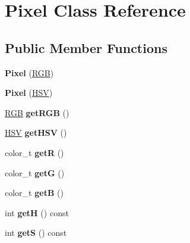 \hypertarget{class_pixel}{\section{Pixel Class Reference}
\label{class_pixel}
}
\subsection*{Public Member Functions}
\begin{DoxyCompactItemize}
\item 
\hypertarget{class_pixel_afe2eb7843df8e519d6abc8b9d4df9688}{{\bfseries Pixel} (\hyperlink{struct_r_g_b}{R\-G\-B})}\label{class_pixel_afe2eb7843df8e519d6abc8b9d4df9688}

\item 
\hypertarget{class_pixel_a5099935f8ed4a93fc04fe94e9897b721}{{\bfseries Pixel} (\hyperlink{struct_h_s_v}{H\-S\-V})}\label{class_pixel_a5099935f8ed4a93fc04fe94e9897b721}

\item 
\hypertarget{class_pixel_a123fe9b4701578656ce46429001ea301}{\hyperlink{struct_r_g_b}{R\-G\-B} {\bfseries get\-R\-G\-B} ()}\label{class_pixel_a123fe9b4701578656ce46429001ea301}

\item 
\hypertarget{class_pixel_adb6c4a94e33ac4029577ce7304ee43dc}{\hyperlink{struct_h_s_v}{H\-S\-V} {\bfseries get\-H\-S\-V} ()}\label{class_pixel_adb6c4a94e33ac4029577ce7304ee43dc}

\item 
\hypertarget{class_pixel_a6e0eb6c9581fbde8e13fd771ff88ada6}{color\-\_\-t {\bfseries get\-R} ()}\label{class_pixel_a6e0eb6c9581fbde8e13fd771ff88ada6}

\item 
\hypertarget{class_pixel_a69bf3cfda8d9543593764c9f2692ba26}{color\-\_\-t {\bfseries get\-G} ()}\label{class_pixel_a69bf3cfda8d9543593764c9f2692ba26}

\item 
\hypertarget{class_pixel_a4249cdc22eb5d95d89928f9f1640849e}{color\-\_\-t {\bfseries get\-B} ()}\label{class_pixel_a4249cdc22eb5d95d89928f9f1640849e}

\item 
\hypertarget{class_pixel_a2b9de1d5e1cf04b38a1cbc5a298543d6}{int {\bfseries get\-H} () const }\label{class_pixel_a2b9de1d5e1cf04b38a1cbc5a298543d6}

\item 
\hypertarget{class_pixel_aa3933520159a789f3a7b819e6d8e4bc6}{int {\bfseries get\-S} () const }\label{class_pixel_aa3933520159a789f3a7b819e6d8e4bc6}


\end{DoxyCompactItemize}
